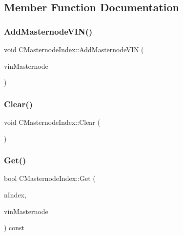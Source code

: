\subsection{Member Function Documentation}
\mbox{\label{class_c_masternode_index_ad62fa26d65c04335b00463c29cd766f7}} 
\subsubsection{\texorpdfstring{Add\+Masternode\+V\+I\+N()}{AddMasternodeVIN()}}
{\footnotesize\ttfamily void C\+Masternode\+Index\+::\+Add\+Masternode\+V\+IN (\begin{DoxyParamCaption}\item[{const C\+Tx\+In \&}]{vin\+Masternode }\end{DoxyParamCaption})}

\mbox{\label{class_c_masternode_index_a6d191c879a7029e41be2f36a5e14af0a}} 
\subsubsection{\texorpdfstring{Clear()}{Clear()}}
{\footnotesize\ttfamily void C\+Masternode\+Index\+::\+Clear (\begin{DoxyParamCaption}{ }\end{DoxyParamCaption})}

\mbox{\label{class_c_masternode_index_a85022155c9093fcb1ea5bb1deb7dd2b0}} 
\subsubsection{\texorpdfstring{Get()}{Get()}}
{\footnotesize\ttfamily bool C\+Masternode\+Index\+::\+Get (\begin{DoxyParamCaption}\item[{int}]{n\+Index,  }\item[{C\+Tx\+In \&}]{vin\+Masternode }\end{DoxyParamCaption}) const}



